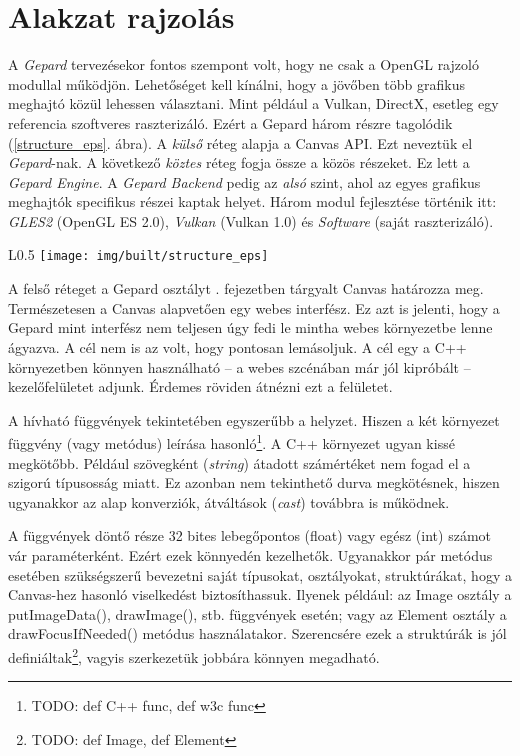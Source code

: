 \documentclass[12pt]{report}
\theoremstyle{definition}
\newcommand{\inenglish}[1]{\textsl{#1}}
\newcommand{\func}[1]{{\textsf{\footnotesize#1}}}
\begin{document}
    \chapter{Alakzat rajzolás}

  A \emph{Gepard} tervezésekor fontos szempont volt, hogy ne csak a
OpenGL rajzoló modullal működjön. Lehetőséget kell kínálni, hogy a jövőben több
grafikus meghajtó közül lehessen választani. Mint például a Vulkan, DirectX,
esetleg egy referencia szoftveres raszterizáló. Ezért a Gepard három részre
tagolódik (\ref{structure_eps}. ábra). A \emph{külső} réteg alapja a Canvas API. Ezt neveztük el
\emph{Gepard}-nak. A következő \emph{köztes} réteg fogja össze a közös
részeket. Ez lett a \emph{Gepard Engine}. A \emph{Gepard Backend} pedig az
\emph{alsó} szint, ahol az egyes grafikus meghajtók specifikus részei kaptak
helyet. Három modul fejlesztése történik itt: \emph{GLES2} (OpenGL ES 2.0),
\emph{Vulkan} (Vulkan 1.0) és \emph{Software} (saját raszterizáló).

    \begin{wrapfigure}{L}{0.5\textwidth}
      \texttt{[image: img/built/structure\_eps]}
      \caption{\label{structure_eps} }
    \end{wrapfigure}

  A felső réteget a \func{Gepard} osztályt .
fejezetben tárgyalt Canvas határozza meg. Természetesen  a Canvas
alapvetően egy webes interfész. Ez azt is jelenti,
hogy a \func{Gepard} mint interfész nem teljesen úgy fedi le mintha webes környezetbe
lenne ágyazva. A cél nem is az volt, hogy pontosan lemásoljuk. A cél egy a C++
környezetben könnyen használható -- a webes szcénában már jól kipróbált --
kezelőfelületet adjunk. Érdemes röviden átnézni ezt a felületet.

  A hívható függvények tekintetében egyszerűbb a helyzet. Hiszen a két
környezet függvény (vagy metódus) leírása hasonló\footnote{TODO: def C++ func,
def w3c func}. A C++ környezet ugyan kissé megkötőbb. Például szövegként
(\inenglish{string}) átadott számértéket nem fogad el a szigorú típusosság
miatt. Ez azonban nem tekinthető durva megkötésnek, hiszen ugyanakkor az alap
konverziók, átváltások (\inenglish{cast}) továbbra is működnek.

  A függvények döntő része 32 bites lebegőpontos (\func{float})
vagy egész (\func{int}) számot vár paraméterként. Ezért ezek könnyedén
kezelhetők. Ugyanakkor pár metódus esetében szükségszerű bevezetni saját
típusokat, osztályokat, struktúrákat, hogy a Canvas-hez hasonló viselkedést
biztosíthassuk. Ilyenek például: az \func{Image} osztály a \func{putImageData()},
\func{drawImage()}, stb. függvények esetén; vagy az \func{Element} osztály a
\func{drawFocusIfNeeded()} metódus használatakor. Szerencsére ezek a struktúrák is jól
definiáltak\footnote{TODO: def Image, def Element}, vagyis szerkezetük jobbára
könnyen megadható.
\end{document}
